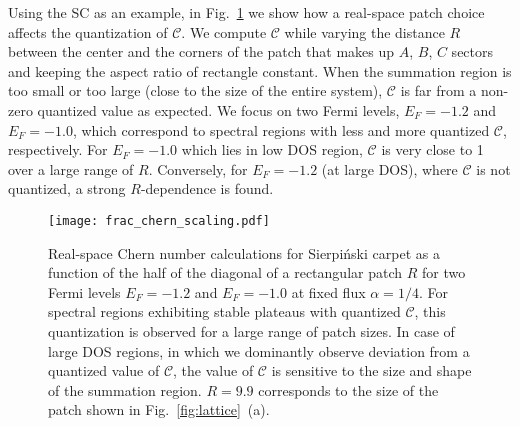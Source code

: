 Using the SC as an example, in Fig.~\ref{fig:ChernScaling} we show how a real-space patch choice affects the quantization of $\mathcal{C}$. We compute $\mathcal{C}$ while varying the distance $R$ between the center and the corners of the patch that makes up $A$, $B$, $C$ sectors and keeping the aspect ratio of rectangle constant. When the summation region is too small or too large (close to the size of the entire system), $\mathcal{C}$ is far from a non-zero quantized value as expected. We focus on two Fermi levels, $E_F = -1.2$ and $E_F = -1.0$, which correspond to spectral regions with less and more quantized $\mathcal{C}$, respectively. For $E_F = -1.0$ which lies in low DOS region, $\mathcal{C}$ is very close to 1 over a large range of $R$. Conversely, for $E_F = -1.2$ (at large DOS), where $\mathcal{C}$ is not quantized, a strong $R$-dependence is found.

\begin{figure}[H]
\centering
\texttt{[image: frac\_chern\_scaling.pdf]}
\caption[Scaling of the Chern number with respect to a real-space patch size]{Real-space Chern number calculations for Sierpiński carpet as a function of the half of the diagonal of a rectangular patch $R$ for two Fermi levels $E_F = -1.2$ and $E_F = -1.0$ at fixed flux $\alpha = 1/4$. For spectral regions exhibiting stable plateaus with quantized $\mathcal{C}$, this quantization is observed for a large range of patch sizes. In case of large DOS regions, in which we dominantly observe deviation from a quantized value of $\mathcal{C}$, the value of $\mathcal{C}$ is sensitive to the size and shape of the summation region. $R = 9.9$ corresponds to the size of the patch shown in Fig.~\ref{fig:lattice}~(a).}
\label{fig:ChernScaling}
\end{figure}

